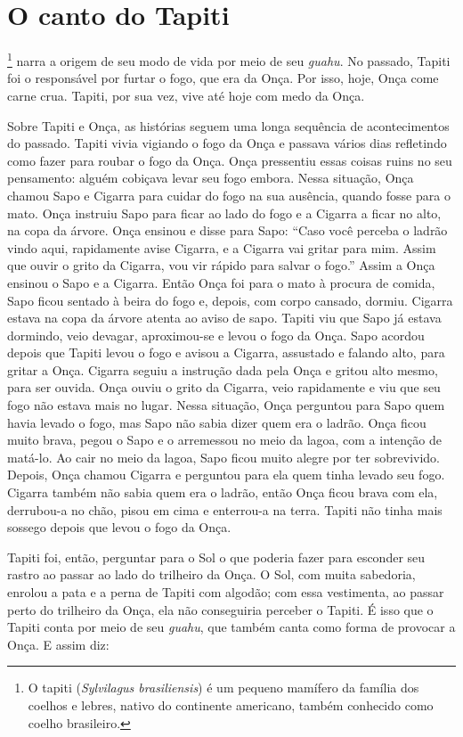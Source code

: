 \chapter{O canto do Tapiti}

\footnote{O tapiti (\textit{Sylvilagus brasiliensis}) é um pequeno
  mamífero da família dos coelhos e lebres, nativo do continente
  americano, também conhecido como coelho brasileiro.} narra a origem de
seu modo de vida por meio de seu \textit{guahu}. No passado, Tapiti foi o
responsável por furtar o fogo, que era da Onça. Por isso, hoje, Onça
come carne crua. Tapiti, por sua vez, vive até hoje com medo da Onça.

Sobre Tapiti e Onça, as histórias seguem uma longa sequência de
acontecimentos do passado. Tapiti vivia vigiando o fogo da Onça e
passava vários dias refletindo como fazer para roubar o fogo da Onça.
Onça pressentiu essas coisas ruins no seu pensamento: alguém cobiçava
levar seu fogo embora. Nessa situação, Onça chamou Sapo e Cigarra para
cuidar do fogo na sua ausência, quando fosse para o mato. Onça instruiu
Sapo para ficar ao lado do fogo e a Cigarra a ficar no alto, na copa da
árvore. Onça ensinou e disse para Sapo: ``Caso você perceba o ladrão
vindo aqui, rapidamente avise Cigarra, e a Cigarra vai gritar para mim.
Assim que ouvir o grito da Cigarra, vou vir rápido para salvar o fogo.''
Assim a Onça ensinou o Sapo e a Cigarra. Então Onça foi para o mato à
procura de comida, Sapo ficou sentado à beira do fogo e, depois, com
corpo cansado, dormiu. Cigarra estava na copa da árvore atenta ao aviso
de sapo. Tapiti viu que Sapo já estava dormindo, veio devagar,
aproximou-se e levou o fogo da Onça. Sapo acordou depois que Tapiti
levou o fogo e avisou a Cigarra, assustado e falando alto, para gritar a
Onça. Cigarra seguiu a instrução dada pela Onça e gritou alto mesmo,
para ser ouvida. Onça ouviu o grito da Cigarra, veio rapidamente e viu
que seu fogo não estava mais no lugar. Nessa situação, Onça perguntou
para Sapo quem havia levado o fogo, mas Sapo não sabia dizer quem era o
ladrão. Onça ficou muito brava, pegou o Sapo e o arremessou no meio da
lagoa, com a intenção de matá-lo. Ao cair no meio da lagoa, Sapo ficou
muito alegre por ter sobrevivido. Depois, Onça chamou Cigarra e
perguntou para ela quem tinha levado seu fogo. Cigarra também não sabia
quem era o ladrão, então Onça ficou brava com ela, derrubou-a no chão,
pisou em cima e enterrou-a na terra. Tapiti não tinha mais sossego
depois que levou o fogo da Onça.

Tapiti foi, então, perguntar para o Sol o que poderia fazer para
esconder seu rastro ao passar ao lado do trilheiro da Onça. O Sol, com
muita sabedoria, enrolou a pata e a perna de Tapiti com algodão; com
essa vestimenta, ao passar perto do trilheiro da Onça, ela não
conseguiria perceber o Tapiti. É isso que o Tapiti conta por meio de seu
\textit{guahu}, que também canta como forma de provocar a Onça. E assim
diz:

